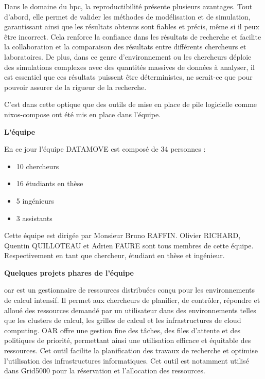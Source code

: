\documentclass[a4paper,french,12pt, titlepage]{article}
\begin{document}
Dans le domaine du \Gls{hpc}, la reproductibilité présente plusieurs
avantages. Tout d'abord, elle permet de valider les méthodes de
modélisation et de simulation, garantissant ainsi que les résultats
obtenus sont fiables et précis, même si il peux être incorrect. Cela
renforce la confiance dans les résultats de recherche et facilite la
collaboration et la comparaison des résultats entre différents
chercheurs et laboratoires. De plus, dans ce genre d'environnement ou
les chercheurs déploie des simulations complexes avec des quantités
massives de données à analyser, il est essentiel que ces résultats
puissent être déterministes, ne serait-ce que pour pouvoir assurer de la
rigueur de la recherche.\newline

C'est dans cette optique que des outils de mise en place de pile
logicielle comme \Gls{nixos-compose} ont été mis en place dans
l'équipe.\newline

\textbf{L'équipe}\newline

En ce jour l'équipe DATAMOVE est composé de 34 personnes :

\begin{itemize}
\item
  10 chercheurs
\item
  16 étudiants en thèse
\item
  5 ingénieurs
\item
  3 assistants\newline
\end{itemize}

Cette équipe est dirigée par Monsieur Bruno RAFFIN. Olivier RICHARD,
Quentin QUILLOTEAU et Adrien FAURE sont tous membres de cette équipe.
Respectivement en tant que chercheur, étudiant en thèse et
ingénieur.\newline

\textbf{Quelques projets phares de l'équipe}\newline

\Gls{oar} est un gestionnaire de ressources distribuées conçu pour les
environnements de calcul intensif. Il permet aux chercheurs de
planifier, de contrôler, répondre et alloué des ressources demandé par
un utilisateur dans des environnements telles que les clusters de
calcul, les grilles de calcul et les infrastructures de cloud computing.
OAR offre une gestion fine des tâches, des files d'attente et des
politiques de priorité, permettant ainsi une utilisation efficace et
équitable des ressources. Cet outil facilite la planification des
travaux de recherche et optimise l'utilisation des infrastructures
informatiques. Cet outil est notamment utilisé dans Grid5000 pour la
réservation et l'allocation des ressources.\newline
\end{document}
